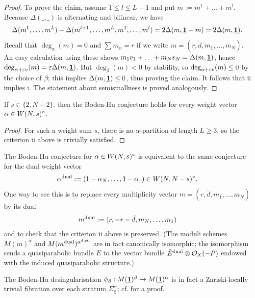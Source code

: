\documentclass{article}
\begin{document}
\begin{proof}
  To prove the claim, assume $1 \leq l \leq L-1$ and put $m := m^1 + \ldots + m^l$. Because $\Delta(\_, \_)$ is alternating and bilinear, we have
  \begin{displaymath}
    \Delta(m^1, \ldots, m^L) - \Delta(m^{l+1}, \ldots, m^L, m^1, \ldots, m^l) = 2 \Delta(m, \underline{\mathbf{1}}-m) = 2 \Delta(m, \underline{\mathbf{1}}).
  \end{displaymath}
  Recall that $\deg_{\alpha}(m) = 0$ and $\sum m_n = r$ if we write $m = (r, \check{d}, m_1, \ldots, m_N)$. An easy calculation using these shows
  $m_1 v_1 + \ldots + m_N v_N = \Delta(m, \underline{\mathbf{1}})$, hence $\deg_{\alpha + \varepsilon v}(m) = \varepsilon \Delta(m, \underline{\mathbf{1}})$. But $\deg_{\beta}(m) < 0$ by stability,
  so $\deg_{\alpha + \varepsilon v}(m) \leq 0$ by the choice of $\beta$; this implies $\Delta(m, \underline{\mathbf{1}}) \leq 0$, thus proving the claim. It follows that ii
  implies i. The statement about semismallness is proved analogously.
\end{proof}

\begin{cor} \label{s_is_two}
  If $s \in \{2, N-2\}$, then the Boden-Hu conjecture holds for every weight vector $\alpha \in W(N, s)^{\circ}$.
\end{cor}
\begin{proof}
  For such a weight sum $s$, there is no $\alpha$-partition of length $L \geq 3$, so the criterion ii above is trivially satisfied.
\end{proof}

\begin{rem} \label{duality}
  The Boden-Hu conjecture for $\alpha \in W(N, s)^{\circ}$ is equivalent to the same conjecture for the dual weight vector
  \begin{displaymath}
    \alpha^{\mathrm{dual}} := (1 - \alpha_N, \ldots, 1 - \alpha_1) \in W(N, N-s)^{\circ}.
  \end{displaymath}
  One way to see this is to replace every multiplicity vector $m = (r, \check{d}, m_1, \ldots, m_N)$ by its dual
  \begin{displaymath}
    m^{\mathrm{dual}} := (r, -r - \check{d}, m_N, \ldots, m_1)
  \end{displaymath}
  and to check that the criterion ii above is preserved. (The moduli schemes $M(m)^{\alpha}$ and $M(m^{\mathrm{dual}})^{\alpha^{\mathrm{dual}}}$ are in fact canonically
  isomorphic; the isomorphism sends a quasiparabolic bundle $E$ to the vector bundle $\check{E}^{\mathrm{dual}} \otimes \mathcal{O}_X(-P)$ endowed with the induced
  quasiparabolic structure.)
\end{rem}

\begin{rem}
  The Boden-Hu desingularisation $\phi_{\beta}: M(\underline{\mathbf{1}})^{\beta} \to M(\underline{\mathbf{1}})^{\alpha}$ is in fact a Zariski-locally trivial fibration over each stratum
  $\Sigma^{\alpha}_{\xi}$; cf. \cite{diss} for a proof.
\end{rem}
\end{document}
